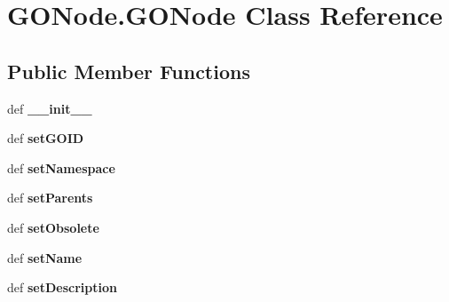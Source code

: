 \hypertarget{class_g_o_node_1_1_g_o_node}{
\section{GONode.GONode Class Reference}
\label{class_g_o_node_1_1_g_o_node}
}
\subsection*{Public Member Functions}
\begin{DoxyCompactItemize}
\item 
\hypertarget{class_g_o_node_1_1_g_o_node_aed2500c2cbac29cc9793c37396b75928}{
def {\bfseries \_\-\_\-init\_\-\_\-}}
\label{class_g_o_node_1_1_g_o_node_aed2500c2cbac29cc9793c37396b75928}

\item 
\hypertarget{class_g_o_node_1_1_g_o_node_a7bc51e25200c46ad8a7557992f90f7ca}{
def {\bfseries setGOID}}
\label{class_g_o_node_1_1_g_o_node_a7bc51e25200c46ad8a7557992f90f7ca}

\item 
\hypertarget{class_g_o_node_1_1_g_o_node_a0590505c8573df5ef3b6e8290e821de1}{
def {\bfseries setNamespace}}
\label{class_g_o_node_1_1_g_o_node_a0590505c8573df5ef3b6e8290e821de1}

\item 
\hypertarget{class_g_o_node_1_1_g_o_node_adf32cb452b5eff47a658d83ef9ce9381}{
def {\bfseries setParents}}
\label{class_g_o_node_1_1_g_o_node_adf32cb452b5eff47a658d83ef9ce9381}

\item 
\hypertarget{class_g_o_node_1_1_g_o_node_a038f04eff9f5d8486280bc70887515fa}{
def {\bfseries setObsolete}}
\label{class_g_o_node_1_1_g_o_node_a038f04eff9f5d8486280bc70887515fa}

\item 
\hypertarget{class_g_o_node_1_1_g_o_node_ab48dc024009773f22884b5a7c75d17cd}{
def {\bfseries setName}}
\label{class_g_o_node_1_1_g_o_node_ab48dc024009773f22884b5a7c75d17cd}

\item 
\hypertarget{class_g_o_node_1_1_g_o_node_a6da2fec8371255c0728c3bed095ab4f9}{
def {\bfseries setDescription}}
\label{class_g_o_node_1_1_g_o_node_a6da2fec8371255c0728c3bed095ab4f9}

\end{DoxyCompactItemize}
